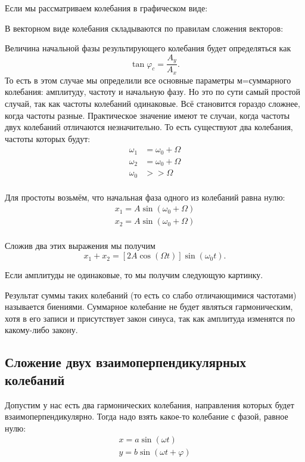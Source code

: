 \documentclass[10pt]{scrbook}
\begin{document}
Если мы рассматриваем колебания в графическом виде:

В векторном виде колебания складываются по правилам сложения векторов:

Величина начальной фазы результирующего колебания будет определяться как \[
	\tan \varphi_c = \frac{A_y}{A_x}
	.\] То есть в этом случае мы определили все основные параметры м=суммарного
колебания: амплитуду, частоту и начальную фазу. Но это по сути самый простой
случай, так как частоты колебаний одинаковые. Всё становится гораздо сложнее,
когда частоты разные. Практическое значение имеют те случаи, когда частоты
двух колебаний отличаются незначительно. То есть существуют два колебания,
частоты которых будут:
\begin{align*}
	\omega_1 & = \omega_0 + \Omega \\
	\omega_2 & = \omega_0 + \Omega \\
	\omega_0 & >> \Omega           \\
\end{align*}

Для простоты возьмём, что начальная фаза одного из колебаний равна нулю:
\begin{align*}
	x_1 = A \sin(\omega_0 + \Omega) \\
	x_2 = A \sin(\omega_0 + \Omega) \\
\end{align*}

Сложив два этих выражения мы получим \[
	x_1 + x_2 = [2 A \cos (\Omega t)] \sin (\omega_0 t)
	.\]

Если амплитуды не одинаковые, то мы получим следующую картинку.

Результат суммы таких колебаний (то есть со слабо отличающимися частотами)
называется биениями. Суммарное колебание не будет являться гармоническим, хотя
в его записи и присутствует закон синуса, так как амплитуда изменятся по
какому-либо закону.

\subsection{Сложение двух взаимоперпендикулярных колебаний}

Допустим у нас есть два гармонических колебания, направления которых будет
взаимоперпендикулярно. Тогда надо взять какое-то колебание с фазой, равное нулю:
\begin{align*}
	x = a \sin(\omega t)           \\
	y = b \sin(\omega t + \varphi) \\
\end{align*}
\end{document}
